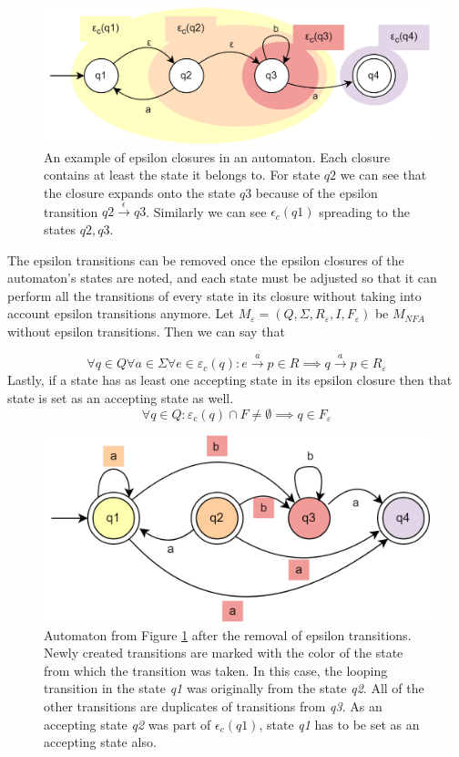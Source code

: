 \begin{figure}[ht]
    \label{eps_closure}
    \centering
    \includegraphics[width=0.7\linewidth]{obrazky-figures/eps_closure.drawio.png}
    \caption{An example of epsilon closures in an automaton. Each closure contains at least the state it belongs to. For state $q2$ we can see that the closure expands onto the state $q3$ because of the epsilon transition $q2\xrightarrow{\epsilon}q3$. Similarly we can see $\epsilon_c(q1)$ spreading to the states $q2, q3$.}
\end{figure}
\vspace{0.3cm}

The epsilon transitions can be removed once the epsilon closures of the automaton's states are noted, and each state must be adjusted so that it can perform all the transitions of every state in its closure without taking into account epsilon transitions anymore. Let $M_{\varepsilon}=(Q, \Sigma, R_\varepsilon, I, F_\varepsilon)$ be $M_{NFA}$ without epsilon transitions. Then we can say that

\begin{equation*}
    \forall q \in Q\forall a \in \Sigma \forall e \in \varepsilon_c(q): e\xrightarrow{a}p \in R \implies q\xrightarrow{a} p \in R_{\varepsilon}
\end{equation*}
Lastly, if a state has as least one accepting state in its epsilon closure then that state is set as an accepting state as well.
\begin{equation*}
    \forall q \in Q: \varepsilon_{c}(q) \cap F \neq \emptyset \implies q \in F_\varepsilon
\end{equation*} 

\begin{figure}[ht]
    \label{eps_rem}
    \centering
    \includegraphics[width=0.7\linewidth]{obrazky-figures/eps_replaced.drawio.png}
    \caption{Automaton from Figure \ref{eps_closure} after the removal of epsilon transitions. Newly created transitions are marked with the color of the state from which the transition was taken. In this case, the looping transition in the state \textit{q1} was originally from the state \textit{q2}. All of the other transitions are duplicates of transitions from \textit{q3}. As an accepting state \textit{q2} was part of $\epsilon_c(q1)$, state \textit{q1} has to be set as an accepting state also.}
\end{figure}
\vspace{0.3cm}

